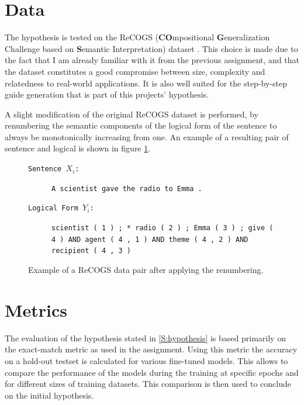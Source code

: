 \documentclass[11pt]{article}
\begin{document}
    \section{Data}

    The hypothesis is tested on the ReCOGS (\textbf{CO}mpositional \textbf{G}eneralization Challenge based on
    \textbf{S}emantic Interpretation) dataset \cite{wu_recogs_2024, kim_cogs_2020}.
    This choice is made due to the fact that I am already familiar with it from the previous assignment, and that the
    dataset constitutes a good compromise between size, complexity and relatedness to real-world applications.
    It is also well suited for the step-by-step guide generation that is part of this projects' hypothesis.

    A slight modification of the original ReCOGS dataset is performed, by renumbering the semantic components of the
    logical form of the sentence to always be monotonically increasing from one.
    An example of a resulting pair of sentence and logical is shown in figure \ref{fig:recogs_base}.

    \begin{figure}
        \small
        \begin{description}
            \item[\texttt{Sentence $X_i$:}] \texttt{A scientist gave the radio to Emma .}
            \item[\texttt{Logical Form $Y_i$:}] \texttt{scientist ( 1 ) ; * radio ( 2 ) ; Emma ( 3 ) ; give ( 4 ) AND agent ( 4 , 1 ) AND theme ( 4 , 2 ) AND recipient ( 4 , 3 )}
        \end{description}
        \caption{Example of a ReCOGS data pair after applying the renumbering.}
        \label{fig:recogs_base}
    \end{figure}


    \section{Metrics}

    The evaluation of the hypothesis stated in \ref{S:hypothesis} is based primarily on the exact-match metric as used
    in the assignment.
    Using this metric the accuracy on a hold-out testset is calculated for various fine-tuned models.
    This allows to compare the performance of the models during the training at specific epochs and for different sizes
    of training datasets.
    This comparison is then used to conclude on the initial hypothesis.
\end{document}
